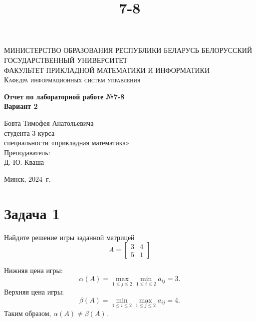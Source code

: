 \documentclass[11pt]{article}
\title{7-8}
\begin{document}
    
    \begin{titlepage}
    	\begin{center}
    		\textsc{МИНИСТЕРСТВО ОБРАЗОВАНИЯ РЕСПУБЛИКИ БЕЛАРУСЬ БЕЛОРУССКИЙ ГОСУДАРСТВЕННЫЙ УНИВЕРСИТЕТ
    			\\[5mm]
    			ФАКУЛЬТЕТ ПРИКЛАДНОЙ МАТЕМАТИКИ И ИНФОРМАТИКИ\\[2mm]
    			Кафедра информационных систем управления
    		}
    		
    		\vfill
    		
    		\textbf{Отчет по лабораторной работе №7-8\\
    			Вариант 2
    			\\[26mm]
    		}
    	\end{center}
    	
    	\hfill
    	\begin{minipage}{.5\textwidth}
    		\begin{flushright}
    			Бовта Тимофея Анатольевича\\
    			студента 3 курса\\
    			специальности «прикладная математика»\\[5mm]
    			
    			Преподаватель:\\[2mm] 
    			Д. Ю. Кваша\\
    		\end{flushright}
    	\end{minipage}%
    	\vfill
    	\begin{center}
    		Минск, 2024\ г.
    	\end{center}
    \end{titlepage}
    
    

    
    \section{Задача 1}\label{ux437ux430ux434ux430ux447ux430-1}

    Найдите решение игры заданной матрицей
\[A = \begin{bmatrix} 3 & 4 \\ 5 & 1 \end{bmatrix}\]

    Нижняя цена игры:
\[\alpha(A)=\max\limits_{1\leq j\leq 2}\min\limits_{1\leq i\leq 2}a_{ij}=3.\]
Верхняя цена игры:
\[\beta(A)=\min\limits_{1\leq i\leq 2}\max\limits_{1\leq j\leq 2}a_{ij}=4.\]
Таким образом, \(\alpha(A)\neq \beta(A)\).
\end{document}
